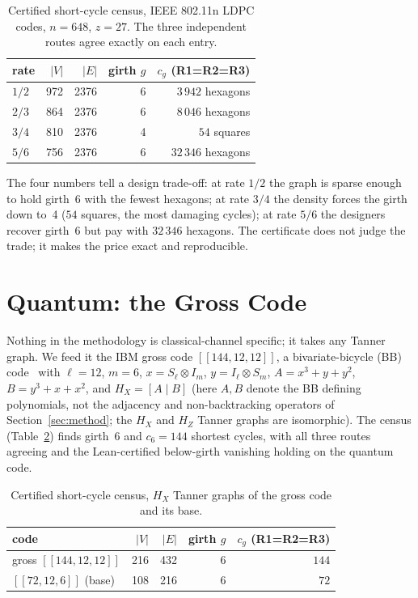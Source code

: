 \documentclass[journal]{IEEEtran}
\begin{document}
\begin{table}[t]
\caption{Certified short-cycle census, IEEE 802.11n LDPC codes, $n=648$, $z=27$.
The three independent routes agree exactly on each entry.}
\label{tab:wifi}
\centering
\begin{tabular}{@{}lrrrr@{}}
\toprule
rate & $|V|$ & $|E|$ & girth $g$ & $c_g$ (R1=R2=R3) \\
\midrule
$1/2$ & 972 & 2376 & 6 & $3\,942$ hexagons \\
$2/3$ & 864 & 2376 & 6 & $8\,046$ hexagons \\
$3/4$ & 810 & 2376 & 4 & $54$ squares \\
$5/6$ & 756 & 2376 & 6 & $32\,346$ hexagons \\
\bottomrule
\end{tabular}
\end{table}

The four numbers tell a design trade-off: at rate $1/2$ the graph is sparse enough to hold
girth~6 with the fewest hexagons; at rate $3/4$ the density forces the girth down to~4 ($54$
squares, the most damaging cycles); at rate $5/6$ the designers recover girth~6 but pay with
$32\,346$ hexagons. The certificate does not judge the trade; it makes the price exact and
reproducible.

\section{Quantum: the Gross Code}
\label{sec:quantum}
Nothing in the methodology is classical-channel specific; it takes any Tanner graph. We feed
it the IBM gross code $[[144,12,12]]$, a bivariate-bicycle (BB) code~\cite{Bravyi} with
$\ell=12$, $m=6$, $x=S_\ell\!\otimes\!I_m$, $y=I_\ell\!\otimes\!S_m$,
$A=x^3+y+y^2$, $B=y^3+x+x^2$, and $H_X=[A\mid B]$ (here $A,B$ denote the BB defining
polynomials, not the adjacency and non-backtracking operators of Section~\ref{sec:method}; the
$H_X$ and $H_Z$ Tanner graphs are isomorphic). The census (Table~\ref{tab:quantum}) finds girth~6 and $c_6=144$ shortest cycles,
with all three routes agreeing and the Lean-certified below-girth vanishing holding on the
quantum code.

\begin{table}[t]
\caption{Certified short-cycle census, $H_X$ Tanner graphs of the gross code and its base.}
\label{tab:quantum}
\centering
\begin{tabular}{@{}lrrrr@{}}
\toprule
code & $|V|$ & $|E|$ & girth $g$ & $c_g$ (R1=R2=R3) \\
\midrule
gross $[[144,12,12]]$ & 216 & 432 & 6 & $144$ \\
$[[72,12,6]]$ (base) & 108 & 216 & 6 & $72$ \\
\bottomrule
\end{tabular}
\end{table}
\end{document}
